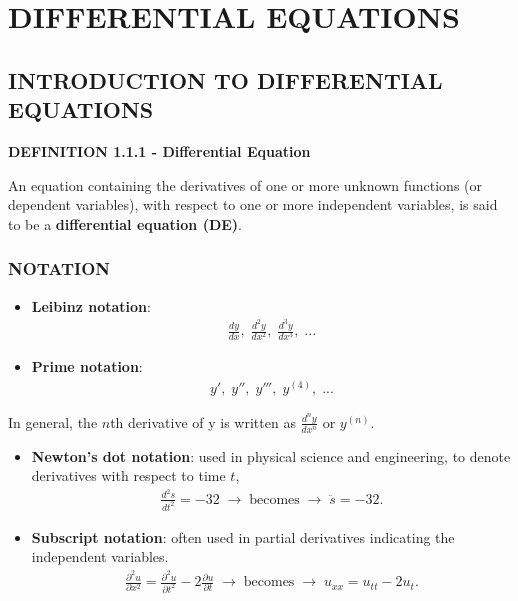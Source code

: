 \documentclass[12pt]{report}
\begin{document}
\part*{DIFFERENTIAL EQUATIONS}


	\chapter{INTRODUCTION TO DIFFERENTIAL EQUATIONS}

	\par \textbf{DEFINITION 1.1.1 - Differential Equation}

	\par An equation containing the derivatives of one or more unknown functions (or dependent variables), with respect to one or more independent variables, is said to be a \textbf{differential equation (DE)}.

		\section{NOTATION}

		\begin{itemize}
			\item \textbf{Leibinz notation}:
			\begin{align*}
				\frac{dy}{dx}, \; \frac{d^{2}y}{dx^{2}}, \; \frac{d^{3}y}{dx^{3}}, \; ...
			\end{align*}
			\item \textbf{Prime notation}:
			\begin{align*}
				y', \; y'', \; y''', \; y^{(4)}, \; ...
			\end{align*}
		\end{itemize}
		In general, the $n$th derivative of y is written as $\frac{d^{n}y}{dx^{n}}$ or $y^{(n)}$.
		\begin{itemize}
			\item \textbf{Newton's dot notation}: used in physical science and engineering, to denote derivatives with respect to time $t$,
			\begin{align*}
				\frac{d^{2}s}{dt^{2}} = -32 \; \rightarrow \; \text{becomes} \; \rightarrow \; \ddot{s} = -32.
			\end{align*}
			\item \textbf{Subscript notation}: often used in partial derivatives indicating the independent variables.
			\begin{align*}
				\frac{\partial^{2} u}{\partial x^{2}} = \frac{\partial^{2} u}{\partial t^{2}} - 2 \frac{\partial u}{\partial t}\; \rightarrow \; \text{becomes} \; \rightarrow \; u_{xx} = u_{tt} - 2 u_{t}.
			\end{align*}
		\end{itemize}
\end{document}
